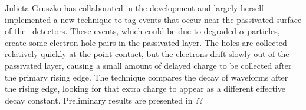 Julieta Gruszko has collaborated in the development and largely herself implemented a new technique to tag events that occur near the passivated surface of the \MJ\ detectors. These events, which could be due to degraded $\alpha$-particles, create some electron-hole pairs in the passivated layer. The holes are collected relatively quickly at the point-contact, but the electrons drift slowly out of the passivated layer, causing a small amount of delayed charge to be collected after the primary rising edge. The technique compares the decay of waveforms after the rising edge, looking for that extra charge to appear as a different effective decay constant. Preliminary results are presented in ??
%
%
%
%
%
%
%
%
%
%
%

